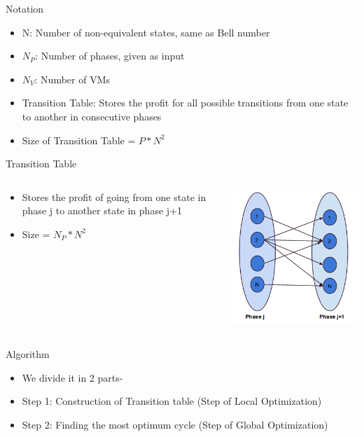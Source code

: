\documentclass{beamer}
\begin{document}
\begin{frame}{Notation}
\begin{itemize}
\item N: Number of non-equivalent states, same as Bell number
\item $N_P$: Number of phases, given as input
\item $N_V$: Number of VMs
\item Transition Table: Stores the profit for all possible transitions from one state to another in consecutive phases
\item Size of Transition Table = $P*N^2$
\end{itemize}
\end{frame}

\begin{frame}{Transition Table}
\begin{columns}[onlytextwidth]
  \begin{column}{0.5\textwidth}
      \begin{itemize}
      \item Stores the profit of going from one state in phase j to another state in phase j+1
      \item Size = $N_P * N^2$
      \end{itemize}
  \end{column}
  \begin{column}{0.5\textwidth}
      \includegraphics[scale=0.6]{images/ts_table}
  \end{column}
\end{columns}
\end{frame}

\begin{frame}{Algorithm}
\begin{itemize}
\item We divide it in 2 parts-
\item Step 1: Construction of Transition table (Step of Local Optimization)
\item Step 2: Finding the most optimum cycle (Step of Global Optimization)
\end{itemize}
\end{frame}
\end{document}
